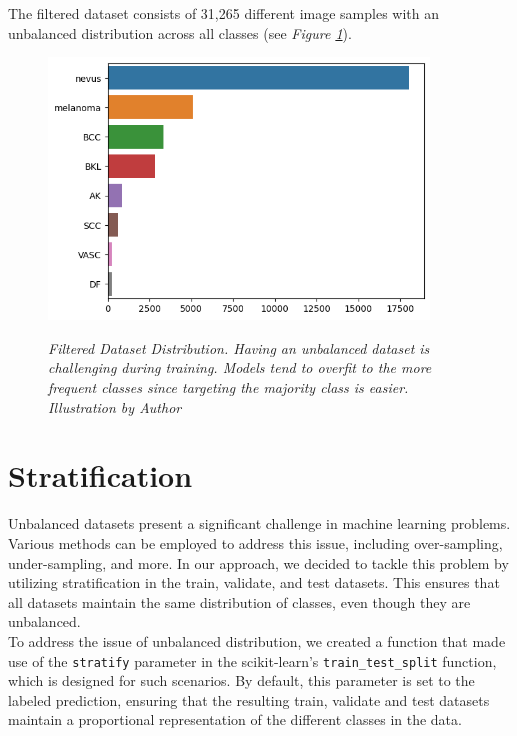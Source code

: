 The filtered dataset consists of 31,265 different image samples with an unbalanced distribution across all classes (see \textit{Figure \ref{fig:hole-dataset-distribution}}).

\begin{figure}[H]
\centering
\includegraphics[width=0.9\textwidth]{imatges/methodological_contribution/hole-dataset-diagnosis.png}
\caption[Filtered Dataset Distribution]{\textit{Filtered Dataset Distribution. Having an unbalanced dataset is challenging during training. Models tend to overfit to the more frequent classes since targeting the majority class is easier. Illustration by Author}}
{\label{fig:hole-dataset-distribution}}
\end{figure}

\section{Stratification}

Unbalanced datasets present a significant challenge in machine learning problems. Various methods can be employed to address this issue, including over-sampling, under-sampling, and more. In our approach, we decided to tackle this problem by utilizing stratification in the train, validate, and test datasets. This ensures that all datasets maintain the same distribution of classes, even though they are unbalanced. \\

To address the issue of unbalanced distribution, we created a function that made use of the {\tt stratify} parameter in the scikit-learn's {\tt train\_test\_split} function, which is designed for such scenarios. By default, this parameter is set to the labeled prediction, ensuring that the resulting train, validate and test datasets maintain a proportional representation of the different classes in the data.

